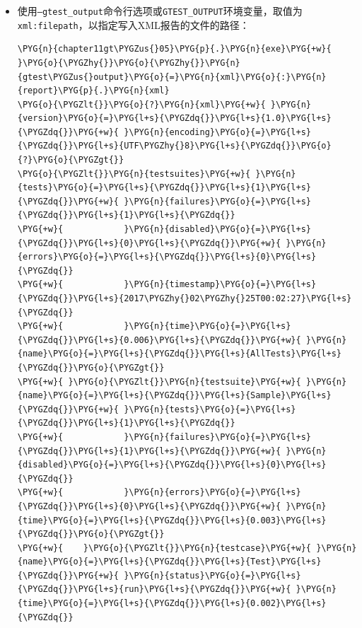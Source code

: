 \begin{itemize}
\item 使用\texttt{--\allowbreak{}gtest\_\allowbreak{}output}命令行选项或\texttt{GTEST\_\allowbreak{}OUTPUT}环境变量，取值为\texttt{xml:\allowbreak{}filepath}，以指定写入XML报告的文件的路径：



\begin{codeblockbg}
\begin{Verbatim}[commandchars=\\\{\},breaklines=true,breakanywhere=true,fontsize=\codefont,xleftmargin=17bp]
\PYG{n}{chapter11gt\PYGZus{}05}\PYG{p}{.}\PYG{n}{exe}\PYG{+w}{ }\PYG{o}{\PYGZhy{}}\PYG{o}{\PYGZhy{}}\PYG{n}{gtest\PYGZus{}output}\PYG{o}{=}\PYG{n}{xml}\PYG{o}{:}\PYG{n}{report}\PYG{p}{.}\PYG{n}{xml}
\PYG{o}{\PYGZlt{}}\PYG{o}{?}\PYG{n}{xml}\PYG{+w}{ }\PYG{n}{version}\PYG{o}{=}\PYG{l+s}{\PYGZdq{}}\PYG{l+s}{1.0}\PYG{l+s}{\PYGZdq{}}\PYG{+w}{ }\PYG{n}{encoding}\PYG{o}{=}\PYG{l+s}{\PYGZdq{}}\PYG{l+s}{UTF\PYGZhy{}8}\PYG{l+s}{\PYGZdq{}}\PYG{o}{?}\PYG{o}{\PYGZgt{}}
\PYG{o}{\PYGZlt{}}\PYG{n}{testsuites}\PYG{+w}{ }\PYG{n}{tests}\PYG{o}{=}\PYG{l+s}{\PYGZdq{}}\PYG{l+s}{1}\PYG{l+s}{\PYGZdq{}}\PYG{+w}{ }\PYG{n}{failures}\PYG{o}{=}\PYG{l+s}{\PYGZdq{}}\PYG{l+s}{1}\PYG{l+s}{\PYGZdq{}}
\PYG{+w}{            }\PYG{n}{disabled}\PYG{o}{=}\PYG{l+s}{\PYGZdq{}}\PYG{l+s}{0}\PYG{l+s}{\PYGZdq{}}\PYG{+w}{ }\PYG{n}{errors}\PYG{o}{=}\PYG{l+s}{\PYGZdq{}}\PYG{l+s}{0}\PYG{l+s}{\PYGZdq{}}
\PYG{+w}{            }\PYG{n}{timestamp}\PYG{o}{=}\PYG{l+s}{\PYGZdq{}}\PYG{l+s}{2017\PYGZhy{}02\PYGZhy{}25T00:02:27}\PYG{l+s}{\PYGZdq{}}
\PYG{+w}{            }\PYG{n}{time}\PYG{o}{=}\PYG{l+s}{\PYGZdq{}}\PYG{l+s}{0.006}\PYG{l+s}{\PYGZdq{}}\PYG{+w}{ }\PYG{n}{name}\PYG{o}{=}\PYG{l+s}{\PYGZdq{}}\PYG{l+s}{AllTests}\PYG{l+s}{\PYGZdq{}}\PYG{o}{\PYGZgt{}}
\PYG{+w}{ }\PYG{o}{\PYGZlt{}}\PYG{n}{testsuite}\PYG{+w}{ }\PYG{n}{name}\PYG{o}{=}\PYG{l+s}{\PYGZdq{}}\PYG{l+s}{Sample}\PYG{l+s}{\PYGZdq{}}\PYG{+w}{ }\PYG{n}{tests}\PYG{o}{=}\PYG{l+s}{\PYGZdq{}}\PYG{l+s}{1}\PYG{l+s}{\PYGZdq{}}
\PYG{+w}{            }\PYG{n}{failures}\PYG{o}{=}\PYG{l+s}{\PYGZdq{}}\PYG{l+s}{1}\PYG{l+s}{\PYGZdq{}}\PYG{+w}{ }\PYG{n}{disabled}\PYG{o}{=}\PYG{l+s}{\PYGZdq{}}\PYG{l+s}{0}\PYG{l+s}{\PYGZdq{}}
\PYG{+w}{            }\PYG{n}{errors}\PYG{o}{=}\PYG{l+s}{\PYGZdq{}}\PYG{l+s}{0}\PYG{l+s}{\PYGZdq{}}\PYG{+w}{ }\PYG{n}{time}\PYG{o}{=}\PYG{l+s}{\PYGZdq{}}\PYG{l+s}{0.003}\PYG{l+s}{\PYGZdq{}}\PYG{o}{\PYGZgt{}}
\PYG{+w}{    }\PYG{o}{\PYGZlt{}}\PYG{n}{testcase}\PYG{+w}{ }\PYG{n}{name}\PYG{o}{=}\PYG{l+s}{\PYGZdq{}}\PYG{l+s}{Test}\PYG{l+s}{\PYGZdq{}}\PYG{+w}{ }\PYG{n}{status}\PYG{o}{=}\PYG{l+s}{\PYGZdq{}}\PYG{l+s}{run}\PYG{l+s}{\PYGZdq{}}\PYG{+w}{ }\PYG{n}{time}\PYG{o}{=}\PYG{l+s}{\PYGZdq{}}\PYG{l+s}{0.002}\PYG{l+s}{\PYGZdq{}}

\end{Verbatim}
\end{codeblockbg}
\end{itemize}
